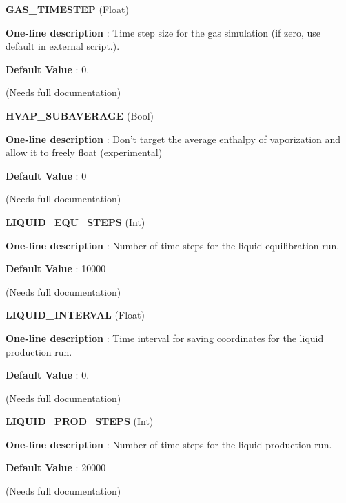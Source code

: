 \begin{DoxyItemize}
\item {\bfseries  G\-A\-S\-\_\-\-T\-I\-M\-E\-S\-T\-E\-P } (Float) \par
{\bfseries  One-\/line description }\-: Time step size for the gas simulation (if zero, use default in external script.). \par
{\bfseries  Default Value }\-: 0. \par
(Needs full documentation)\end{DoxyItemize}
\begin{DoxyItemize}
\item {\bfseries  H\-V\-A\-P\-\_\-\-S\-U\-B\-A\-V\-E\-R\-A\-G\-E } (Bool) \par
{\bfseries  One-\/line description }\-: Don't target the average enthalpy of vaporization and allow it to freely float (experimental) \par
{\bfseries  Default Value }\-: 0 \par
(Needs full documentation)\end{DoxyItemize}
\begin{DoxyItemize}
\item {\bfseries  L\-I\-Q\-U\-I\-D\-\_\-\-E\-Q\-U\-\_\-\-S\-T\-E\-P\-S } (Int) \par
{\bfseries  One-\/line description }\-: Number of time steps for the liquid equilibration run. \par
{\bfseries  Default Value }\-: 10000 \par
(Needs full documentation)\end{DoxyItemize}
\begin{DoxyItemize}
\item {\bfseries  L\-I\-Q\-U\-I\-D\-\_\-\-I\-N\-T\-E\-R\-V\-A\-L } (Float) \par
{\bfseries  One-\/line description }\-: Time interval for saving coordinates for the liquid production run. \par
{\bfseries  Default Value }\-: 0. \par
(Needs full documentation)\end{DoxyItemize}
\begin{DoxyItemize}
\item {\bfseries  L\-I\-Q\-U\-I\-D\-\_\-\-P\-R\-O\-D\-\_\-\-S\-T\-E\-P\-S } (Int) \par
{\bfseries  One-\/line description }\-: Number of time steps for the liquid production run. \par
{\bfseries  Default Value }\-: 20000 \par
(Needs full documentation)\end{DoxyItemize}
